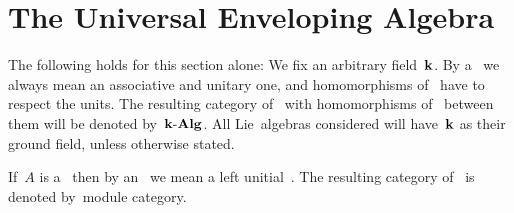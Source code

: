 \chapter{The Universal Enveloping Algebra}


\begin{convention}
  The following holds for this section alone:
  We fix an arbitrary field~$\kf$.
  By a~{\algebra{$\kf$}} we always mean an associative and unitary one, and homomorphisms of~{\algebras{$\kf$}} have to respect the units.
  The resulting category of~{\algebras{$\kf$}} with homomorphisms of~{\algebra{$\kf$}} between them will be denoted by~$\mathbf{k}\text{-}\mathbf{Alg}$.
  All Lie~algebras considered will have~$\kf$ as their ground field, unless otherwise stated.
  
  If~$A$ is a~{\algebra{$\kf$}} then by an~ we mean a left unitial~{}.
  The resulting category of~{} is denoted by~\gls*{module category}.
\end{convention}












